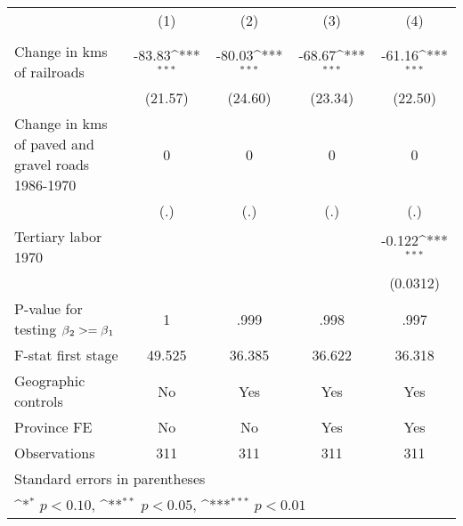 {
\def\sym#1{\ifmmode^{#1}\else\(^{#1}\)\fi}
\begin{tabular}{l*{4}{c}}
\hline\hline
                &\multicolumn{1}{c}{(1)}&\multicolumn{1}{c}{(2)}&\multicolumn{1}{c}{(3)}&\multicolumn{1}{c}{(4)}\\
                &\multicolumn{1}{c}{}&\multicolumn{1}{c}{}&\multicolumn{1}{c}{}&\multicolumn{1}{c}{}\\
\hline
Change in kms of railroads&   -83.83\sym{***}&   -80.03\sym{***}&   -68.67\sym{***}&   -61.16\sym{***}\\
                &  (21.57)         &  (24.60)         &  (23.34)         &  (22.50)         \\
[1em]
Change in kms of paved and gravel roads 1986-1970&        0         &        0         &        0         &        0         \\
                &      (.)         &      (.)         &      (.)         &      (.)         \\
[1em]
Tertiary labor 1970&                  &                  &                  &   -0.122\sym{***}\\
                &                  &                  &                  & (0.0312)         \\
\hline
P-value for testing $\beta\\_2 >= \beta\\_1$&        1         &     .999         &     .998         &     .997         \\
F-stat first stage&   49.525         &   36.385         &   36.622         &   36.318         \\
Geographic controls&       No         &      Yes         &      Yes         &      Yes         \\
Province FE     &       No         &       No         &      Yes         &      Yes         \\
Observations    &      311         &      311         &      311         &      311         \\
\hline\hline
\multicolumn{5}{l}{\footnotesize Standard errors in parentheses}\\
\multicolumn{5}{l}{\footnotesize \sym{*} \(p<0.10\), \sym{**} \(p<0.05\), \sym{***} \(p<0.01\)}\\
\end{tabular}
}
